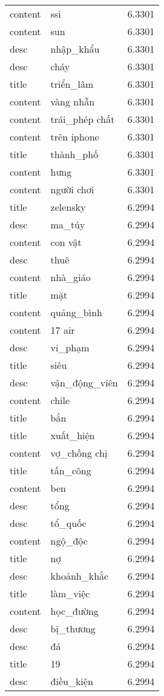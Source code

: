 \documentclass{article}
\begin{document}
\begin{tabular}{lll}
content & ssi & 6.3301\\
content & sun & 6.3301\\
desc & nhập\_khẩu & 6.3301\\
desc & cháy & 6.3301\\
title & triển\_lãm & 6.3301\\
content & vàng nhẫn & 6.3301\\
content & trái\_phép chất & 6.3301\\
content & trên iphone & 6.3301\\
title & thành\_phố & 6.3301\\
content & hưng & 6.3301\\
content & người chơi & 6.3301\\
title & zelensky & 6.2994\\
desc & ma\_túy & 6.2994\\
content & con vật & 6.2994\\
desc & thuê & 6.2994\\
content & nhà\_giáo & 6.2994\\
title & mặt & 6.2994\\
content & quảng\_bình & 6.2994\\
content & 17 air & 6.2994\\
desc & vi\_phạm & 6.2994\\
title & siêu & 6.2994\\
desc & vận\_động\_viên & 6.2994\\
content & chile & 6.2994\\
title & bắn & 6.2994\\
title & xuất\_hiện & 6.2994\\
content & vợ\_chồng chị & 6.2994\\
title & tấn\_công & 6.2994\\
content & ben & 6.2994\\
desc & tổng & 6.2994\\
desc & tổ\_quốc & 6.2994\\
content & ngộ\_độc & 6.2994\\
title & nợ & 6.2994\\
desc & khoảnh\_khắc & 6.2994\\
title & làm\_việc & 6.2994\\
content & học\_đường & 6.2994\\
desc & bị\_thương & 6.2994\\
desc & đá & 6.2994\\
title & 19 & 6.2994\\
desc & điều\_kiện & 6.2994\\

\end{tabular}
\end{document}
